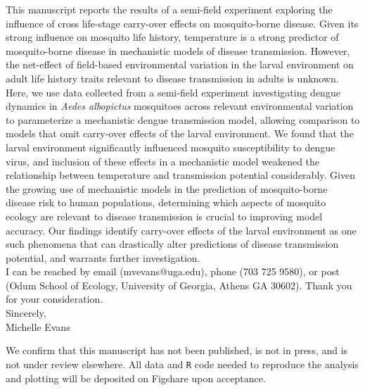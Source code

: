 \documentclass{letter}
\begin{document}
\begin{letter}
This manuscript reports the results of a semi-field experiment exploring the influence of cross life-stage carry-over effects on mosquito-borne disease. Given its strong influence on mosquito life history, temperature is a strong predictor of mosquito-borne disease in mechanistic models of disease transmission. However, the net-effect of field-based environmental variation in the larval environment on adult life history traits relevant to disease transmission in adults is unknown. Here, we use data collected from a semi-field experiment investigating dengue dynamics in \textit{Aedes albopictus} mosquitoes across relevant environmental variation to parameterize a mechanistic dengue transmission model, allowing comparison to models that omit carry-over effects of the larval environment. We found that the larval environment significantly influenced mosquito susceptibility to dengue virus, and inclusion of these effects in a mechanistic model weakened the relationship between temperature and transmission potential considerably. Given the growing use of mechanistic models in the prediction of mosquito-borne disease risk to human populations, determining which aspects of mosquito ecology are relevant to disease transmission is crucial to improving model accuracy. Our findings identify carry-over effects of the larval environment as one such phenomena that can drastically alter predictions of disease transmission potential, and warrants further investigation. \\

I can be reached by email (mvevans@uga.edu), phone (703 725 9580), or post (Odum School of Ecology, University of Georgia, Athens GA 30602). Thank you for your consideration. \\

Sincerely,\\
Michelle Evans

\vspace{1cm}

\footnotesize
We confirm that this manuscript has not been published, is not in press, and is not under review elsewhere. All data and \texttt{R} code needed to reproduce the analysis and plotting will be deposited on Figshare upon acceptance.



\end{letter}
\end{document}
